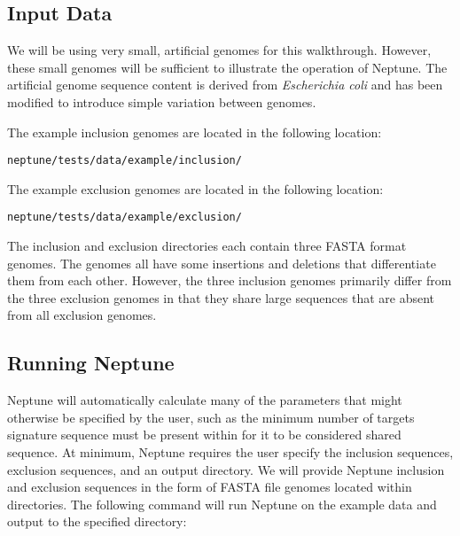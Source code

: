\documentclass[a4paper,10pt]{article}
\begin{document}
\subsection{Input Data}

We will be using very small, artificial genomes for this walkthrough. However, these small genomes will be sufficient to illustrate the operation of Neptune. The artificial genome sequence content is derived from \textit{Escherichia coli} and has been modified to introduce simple variation between genomes.

The example inclusion genomes are located in the following location:

\begin{minipage}{\linewidth}
\begin{lstlisting}[frame=single, style=bash]
neptune/tests/data/example/inclusion/
\end{lstlisting}
\end{minipage}

The example exclusion genomes are located in the following location:

\begin{minipage}{\linewidth}
\begin{lstlisting}[frame=single, style=bash]
neptune/tests/data/example/exclusion/
\end{lstlisting}
\end{minipage}

The inclusion and exclusion directories each contain three FASTA format genomes. The genomes all have some insertions and deletions that differentiate them from each other. However, the three inclusion genomes primarily differ from the three exclusion genomes in that they share large sequences that are absent from all exclusion genomes.

\subsection{Running Neptune}

Neptune will automatically calculate many of the parameters that might otherwise be specified by the user, such as the minimum number of targets signature sequence must be present within for it to be considered shared sequence. At minimum, Neptune requires the user specify the inclusion sequences, exclusion sequences, and an output directory. We will provide Neptune inclusion and exclusion sequences in the form of FASTA file genomes located within directories. The following command will run Neptune on the example data and output to the specified directory:
\end{document}

